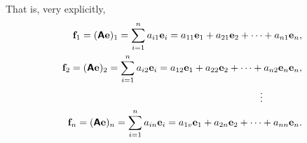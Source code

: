 That is, very explicitly,
\begin{equation}
\begin{split}
{\bf f}_1=
(\textsf{\textbf{A}}{\bf e})_1     = \sum_{i=1}^n a_{i1} {\bf e}_i
=
a_{11} {\bf e}_1 + a_{21} {\bf e}_2+\cdots + a_{n1} {\bf e}_n,\\
{\bf f}_2=
(\textsf{\textbf{A}}{\bf e})_2    = \sum_{i=1}^n a_{i2} {\bf e}_i
=
a_{12} {\bf e}_1 + a_{22} {\bf e}_2+\cdots + a_{n2} {\bf e}_n {\bf e}_n ,\\
 \vdots \qquad \qquad \\
{\bf f}_n=
(\textsf{\textbf{A}}{\bf e})_n      = \sum_{i=1}^n a_{in} {\bf e}_i
= a_{1v} {\bf e}_1 + a_{2n} {\bf e}_2+\cdots + a_{nn} {\bf e}_n .
\end{split}
\label{2011-m-btbe-eigen}
\end{equation}


